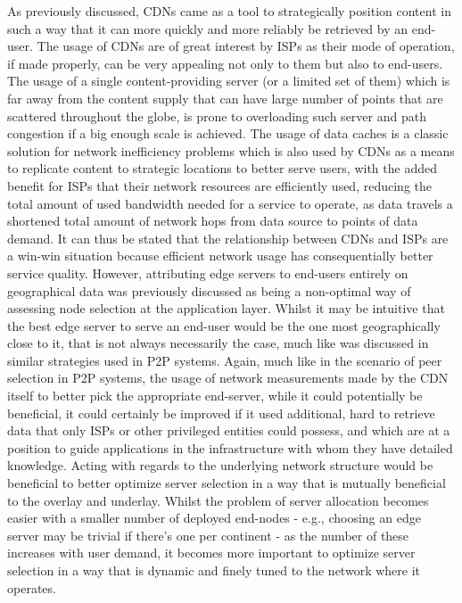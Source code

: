     As previously discussed, CDNs came as a tool to strategically position content in such a way that it can more quickly and more reliably be retrieved by an end-user.
    The usage of CDNs are of great interest by ISPs as their mode of operation, if made properly, can be very appealing not only to them but also to end-users.
    The usage of a single content-providing server (or a limited set of them) which is far away from the content supply that can have large number of points that are scattered throughout the globe, is prone to overloading such server and path congestion if a big enough scale is achieved.
    The usage of data caches is a classic solution for network inefficiency problems which is also used by CDNs as a means to replicate content to strategic locations to better serve users, with the added benefit for ISPs that their network resources are efficiently used, reducing the total amount of used bandwidth needed for a service to operate, as data travels a shortened total amount of network hops from data source to points of data demand.
    It can thus be stated that the relationship between CDNs and ISPs are a win-win situation because efficient network usage has consequentially better service quality.
    However, attributing edge servers to end-users entirely on geographical data was previously discussed as being a non-optimal way of assessing node selection at the application layer.
    Whilst it may be intuitive that the best edge server to serve an end-user would be the one most geographically close to it, that is not always necessarily the case, much like was discussed in similar strategies used in P2P systems.
    Again, much like in the scenario of peer selection in P2P systems, the usage of network measurements made by the CDN itself to better pick the appropriate end-server, while it could potentially be beneficial, it could certainly be improved if it used additional, hard to retrieve data that only ISPs or other privileged entities could possess, and which are at a position to guide applications in the infrastructure with whom they have detailed knowledge.
    Acting with regards to the underlying network structure would be beneficial to better optimize server selection in a way that is mutually beneficial to the overlay and underlay.
    Whilst the problem of server allocation becomes easier with a smaller number of deployed end-nodes - e.g., choosing an edge server may be trivial if there's one per continent - as the number of these increases with user demand, it becomes more important to optimize server selection in a way that is dynamic and finely tuned to the network where it operates.

